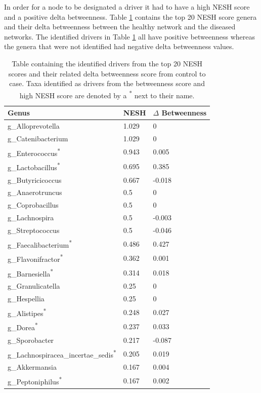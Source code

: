 In order for a node to be designated a driver it had to have a high \acrshort{NESH} score and a positive delta betweenness. Table \ref{tab:nesh-btwn} contains the top 20 \acrshort{NESH} score genera and their delta betweenness between the healthy network and the diseased networks. The identified drivers in Table \ref{tab:nesh-btwn} all have positive betweenness whereas the genera that were not identified had negative delta betweenness values. 

\begin{table}[!hbt]
\centering
\begin{tabular}{lll}
\toprule
Genus & \acrshort{NESH} & $\Delta$ Betweenness\\
\midrule
g\_Alloprevotella & 1.029 &	0\\
g\_Catenibacterium & 1.029 &	0\\
g\_Enterococcus\textsuperscript{*} & 0.943 &	0.005\\
g\_Lactobacillus\textsuperscript{*} & 0.695 &	0.385\\
g\_Butyricicoccus & 0.667 &	-0.018\\
g\_Anaerotruncus & 0.5 &	0\\
g\_Coprobacillus & 0.5 &	0\\
g\_Lachnospira & 0.5 &	-0.003\\
g\_Streptococcus & 0.5 &	-0.046\\
g\_Faecalibacterium\textsuperscript{*} & 0.486 &	0.427\\
g\_Flavonifractor\textsuperscript{*} & 0.362 &	0.001\\
g\_Barnesiella\textsuperscript{*} & 0.314 &	0.018\\
g\_Granulicatella & 0.25 &	0\\
g\_Hespellia & 0.25 &	0\\
g\_Alistipes\textsuperscript{*} & 0.248 &	0.027\\
g\_Dorea\textsuperscript{*} & 0.237 &	0.033\\
g\_Sporobacter & 0.217 &	-0.087\\
g\_Lachnospiracea\_incertae\_sedis\textsuperscript{*}& 0.205 &	0.019\\
g\_Akkermansia & 0.167 &	0.004\\
g\_Peptoniphilus\textsuperscript{*} & 0.167 &	0.002\\

  \bottomrule
\end{tabular}
\caption[Table containing the identified drivers from the top 20 \acrshort{NESH} scores.]{Table containing the identified drivers from the top 20 \acrshort{NESH} scores and their related delta betweenness score from control to case. Taxa identified as drivers from the betweenness score and high \acrshort{NESH} score are denoted by a \textsuperscript{*} next to their name.}
\label{tab:nesh-btwn}
\end{table}
